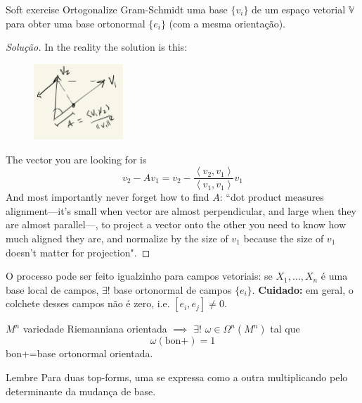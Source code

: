 \begin{thing7}{Soft exercise}\leavevmode
Ortogonalize Gram-Schmidt uma base \(\{v_i\}\) de um espaço vetorial \(\mathbb{V}\) para obter uma base ortonormal \(\{e_i\}\) (com a mesma orientação).
\end{thing7}

\begin{proof}[Solução]\leavevmode
In the reality the solution is this:
\begin{figure}[H]
	\centering
	\includegraphics[width=0.3\textwidth]{fig1}
\end{figure}
The vector you are looking for is 
 \[v_2-Av_1=v_2-\frac{\left<v_2,v_1\right>}{\left<v_1,v_1\right>}v_1\]
 And most importantly never forget how to find \(A\):  ``dot product measures alignment---it's small when vector are almost perpendicular, and large when they are almost parallel---, to project a vector onto the other you need to know how much aligned they are, and normalize by the size of \(v_1\) because the size of \(v_1\) doesn't matter for projection".

\end{proof}

\begin{remark}\leavevmode
	O processo pode ser feito igualzinho para campos vetoriais: se \(X_1,\ldots,X_n\) é uma base local de campos, \(\exists !\) base ortonormal de campos \(\{e_i\}\). \textbf{Cuidado:} em geral, o colchete desses campos não é zero, i.e.  \([e_i,e_j] \neq 0\).
\end{remark}

\begin{prop}\leavevmode
\(M^n\) variedade Riemanniana orientada  \(\implies\) \(\exists !\) \(\omega \in \Omega^{n}(M^n)\) tal que
\[\omega(\text{bon+} )=1\]
bon+=base ortonormal orientada.
\end{prop}

\begin{thing6}{Lembre}\leavevmode
Para duas top-forms, uma se expressa como a outra multiplicando pelo determinante da mudança de base.
\end{thing6}

